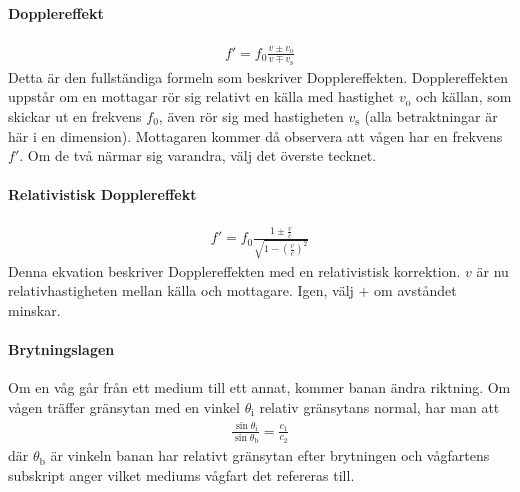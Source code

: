 \paragraph{Dopplereffekt}
\begin{align*}
	f' = f_0\frac{v\pm v_{\text{o}}}{v\mp v_{\text{s}}}
\end{align*}
Detta är den fullständiga formeln som beskriver Dopplereffekten. Dopplereffekten uppstår om en mottagar rör sig relativt en källa med hastighet $v_{\text{o}}$ och källan, som skickar ut en frekvens $f_0$, även rör sig med hastigheten $v_{\text{s}}$ (alla betraktningar är här i en dimension). Mottagaren kommer då observera att vågen har en frekvens $f'$. Om de två närmar sig varandra, välj det överste tecknet.

\deriv

\paragraph{Relativistisk Dopplereffekt}
\begin{align*}
	f' = f_0\frac{1\pm\frac{v}{c}}{\sqrt{1 - \left(\frac{v}{c}\right)^2}}
\end{align*}
Denna ekvation beskriver Dopplereffekten med en relativistisk korrektion. $v$ är nu relativhastigheten mellan källa och mottagare. Igen, välj $+$ om avståndet minskar.

\paragraph{Brytningslagen}
Om en våg går från ett medium till ett annat, kommer banan ändra riktning. Om vågen träffer gränsytan med en vinkel $\theta_{\text{i}}$ relativ gränsytans normal, har man att
\begin{align*}
	\frac{\sin{\theta_{\text{i}}}}{\sin{\theta_{\text{b}}}} = \frac{c_{1}}{c_{2}}
\end{align*}
där $\theta_{\text{b}}$ är vinkeln banan har relativt gränsytan efter brytningen och vågfartens subskript anger vilket mediums vågfart det refereras till.

